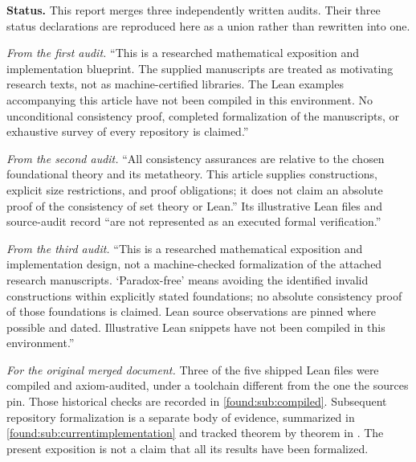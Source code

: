 \documentclass[11pt,letterpaper]{article}
\numberwithin{equation}{section}
\theoremstyle{definition}
\theoremstyle{remark}
\begin{document}
\begin{titlepage}
\begin{minipage}{0.94\textwidth}
\begin{abstract}
The central lesson is the discipline of three meanings of ``all'': all members
of a specified set; all values at a specified universe level subject to
smaller-index rules; and the entire definable class. The unifying rule behind
that discipline is that \emph{an individual object can have small data without
the totality of all such objects being small}. Smallness, algebraic closure,
summability and ambient topology must be separate stated hypotheses rather than
connotations of the word ``surreal.''
\end{abstract}
\end{minipage}
\vfill
\end{titlepage}
\hypersetup{pageanchor=true}
\thispagestyle{empty}
\noindent
\begin{minipage}{\textwidth}\small
\textbf{Status.} This report merges three independently written audits. Their
three status declarations are reproduced here as a union rather than rewritten
into one.

\smallskip
\emph{From the first audit.} ``This is a researched mathematical exposition and
implementation blueprint. The supplied manuscripts are treated as motivating
research texts, not as machine-certified libraries. The Lean examples
accompanying this article have not been compiled in this environment. No
unconditional consistency proof, completed formalization of the manuscripts, or
exhaustive survey of every repository is claimed.''

\smallskip
\emph{From the second audit.} ``All consistency assurances are relative to the
chosen foundational theory and its metatheory. This article supplies
constructions, explicit size restrictions, and proof obligations; it does not
claim an absolute proof of the consistency of set theory or Lean.'' Its
illustrative Lean files and source-audit record ``are not represented as an
executed formal verification.''

\smallskip
\emph{From the third audit.} ``This is a researched mathematical exposition and
implementation design, not a machine-checked formalization of the attached
research manuscripts. `Paradox-free' means avoiding the identified invalid
constructions within explicitly stated foundations; no absolute consistency
proof of those foundations is claimed. Lean source observations are pinned
where possible and dated. Illustrative Lean snippets have not been compiled in
this environment.''

\smallskip
\emph{For the original merged document.} Three of the five shipped Lean files
were compiled and axiom-audited, under a toolchain different from the one the
sources pin. Those historical checks are recorded in
\cref{found:sub:compiled}. Subsequent repository formalization is a separate
body of evidence, summarized in \cref{found:sub:currentimplementation} and
tracked theorem by theorem in . The present
exposition is not a claim that all its results have been formalized.
\end{minipage}
\clearpage
\begingroup\small\setlength{\parskip}{0pt}\tableofcontents\endgroup
\clearpage
{}
\end{document}
